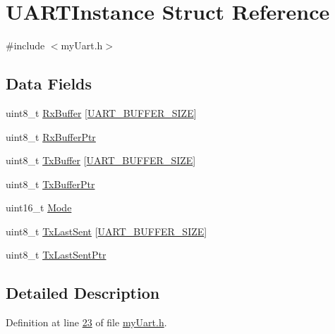 \hypertarget{struct_u_a_r_t_instance}{\section{U\-A\-R\-T\-Instance Struct Reference}
\label{struct_u_a_r_t_instance}
}


{\ttfamily \#include $<$my\-Uart.\-h$>$}

\subsection*{Data Fields}
\begin{DoxyCompactItemize}
\item 
uint8\-\_\-t \hyperlink{struct_u_a_r_t_instance_a19e526bc57bbb10939b53ea13eee30fa}{Rx\-Buffer} \mbox{[}\hyperlink{my_uart_8h_a0d57378e32bf8278011460740bc29f7f}{U\-A\-R\-T\-\_\-\-B\-U\-F\-F\-E\-R\-\_\-\-S\-I\-Z\-E}\mbox{]}
\item 
uint8\-\_\-t \hyperlink{struct_u_a_r_t_instance_a207dabce7103416b36680d9ecc050684}{Rx\-Buffer\-Ptr}
\item 
uint8\-\_\-t \hyperlink{struct_u_a_r_t_instance_a77d9f6986b01073dd0d2385d2e34f961}{Tx\-Buffer} \mbox{[}\hyperlink{my_uart_8h_a0d57378e32bf8278011460740bc29f7f}{U\-A\-R\-T\-\_\-\-B\-U\-F\-F\-E\-R\-\_\-\-S\-I\-Z\-E}\mbox{]}
\item 
uint8\-\_\-t \hyperlink{struct_u_a_r_t_instance_ada90140ddc0177a452e32c0a1268f0fe}{Tx\-Buffer\-Ptr}
\item 
uint16\-\_\-t \hyperlink{struct_u_a_r_t_instance_a6cdb50e2027bf68b7ad66e2863c1ae29}{Mode}
\item 
uint8\-\_\-t \hyperlink{struct_u_a_r_t_instance_ac79c2c5b8bc7ae929e76b44e9b0d71a8}{Tx\-Last\-Sent} \mbox{[}\hyperlink{my_uart_8h_a0d57378e32bf8278011460740bc29f7f}{U\-A\-R\-T\-\_\-\-B\-U\-F\-F\-E\-R\-\_\-\-S\-I\-Z\-E}\mbox{]}
\item 
uint8\-\_\-t \hyperlink{struct_u_a_r_t_instance_a61c194974dc7b5951c59543ecbf6c651}{Tx\-Last\-Sent\-Ptr}
\end{DoxyCompactItemize}


\subsection{Detailed Description}


Definition at line \hyperlink{my_uart_8h_source_l00023}{23} of file \hyperlink{my_uart_8h_source}{my\-Uart.\-h}.



